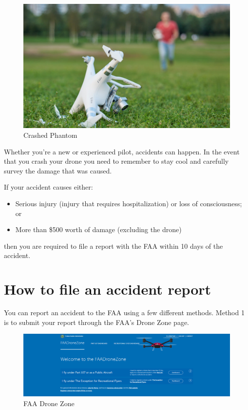 \documentclass[
]{book}
\providecommand{\tightlist}{%
  \setlength{\itemsep}{0pt}\setlength{\parskip}{0pt}}
\begin{document}
\begin{figure}
\centering
\includegraphics{images/DroneCrash.jpg}
\caption{Crashed Phantom}
\end{figure}

Whether you're a new or experienced pilot, accidents can happen. In the event that you crash your drone you need to remember to stay cool and carefully survey the damage that was caused.

If your accident causes either:

\begin{itemize}
\tightlist
\item
  Serious injury (injury that requires hospitalization) or loss of consciousness; or
\item
  More than \$500 worth of damage (excluding the drone)
\end{itemize}

then you are required to file a report with the FAA within 10 days of the accident.

\hypertarget{how-to-file-an-accident-report}{%
\section{How to file an accident report}\label{how-to-file-an-accident-report}}

You can report an accident to the FAA using a few different methods. Method 1 is to submit your report through the FAA's Drone Zone page.

\begin{figure}
\centering
\includegraphics{images/FAA_DroneZone.png}
\caption{FAA Drone Zone}
\end{figure}
\end{document}
